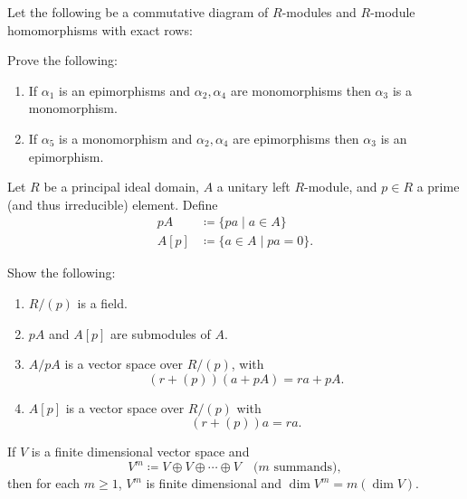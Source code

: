 \begin{problem}[Hungerford 4.1.12]
\label{prob:1.1}
Let the following be a commutative diagram of $R$-modules and $R$-module homomorphisms with exact rows:

\begin{center}
\end{center}

Prove the following:
\begin{enumerate}
    \item If $\alpha_1$ is an epimorphisms and $\alpha_2, \alpha_4$ are monomorphisms then $\alpha_3$ is a monomorphism.
    \item If $\alpha_5$ is a monomorphism and $\alpha_2, \alpha_4$ are epimorphisms then $\alpha_3$ is an epimorphism.
\end{enumerate}
\end{problem}

\begin{problem}[Hungerford 4.2.4]
\label{prob:1.1}
Let $R$ be a principal ideal domain, $A$ a unitary left $R$-module, and $p\in R$ a prime (and thus irreducible) element. Define
\begin{align*}
    pA &\coloneqq \{ pa \mid a\in A\} \\
    A[p] &\coloneqq \{ a\in A \mid pa = 0\}.
\end{align*}

Show the following:
\begin{enumerate}
    \item $R/(p)$ is a field.
    \item $pA$ and $A[p]$ are submodules of $A$.
    \item $A/pA$ is a vector space over $R/(p)$, with 
    \[(r + (p))(a + pA) = ra + pA.\]
    \item $A[p]$ is a vector space over $R/(p)$ with 
    \[(r + (p))a = ra.\]
\end{enumerate}
\end{problem}

\begin{problem}[Hungerford 4.2.8]
\label{prob:1.1}
If $V$ is a finite dimensional vector space and
\[
V^m \coloneqq V \oplus V \oplus \cdots \oplus V \quad \text{($m$ summands)},
\]
then for each $m\geq 1$, $V^m$ is finite dimensional and $\dim V^m = m(\dim V)$.
\end{problem}

